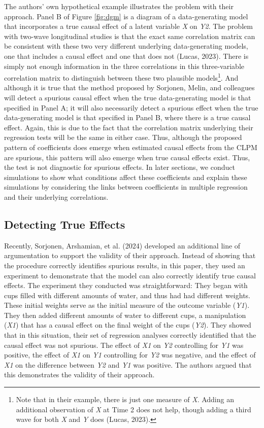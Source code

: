 \documentclass[
  man,floatsintext]{apa6}
\begin{document}
The authors' own hypothetical example illustrates the problem with their approach. Panel B of Figure \ref{fig:dgm} is a diagram of a data-generating model that incorporates a true causal effect of a latent variable \emph{X} on \emph{Y2}. The problem with two-wave longitudinal studies is that the exact same correlation matrix can be consistent with these two very different underlying data-generating models, one that includes a causal effect and one that does not (Lucas, 2023). There is simply not enough information in the three correlations in this three-variable correlation matrix to distinguish between these two plausible models\footnote{Note that in their example, there is just one measure of \emph{X}. Adding an additional observation of \emph{X} at Time 2 does not help, though adding a third wave for both \emph{X} and \emph{Y} does (Lucas, 2023).}. And although it is true that the method proposed by Sorjonen, Melin, and colleagues will detect a spurious causal effect when the true data-generating model is that specified in Panel A; it will also necessarily detect a spurious effect when the true data-generating model is that specified in Panel B, where there is a true causal effect. Again, this is due to the fact that the correlation matrix underlying their regression tests will be the same in either case. Thus, although the proposed pattern of coefficients does emerge when estimated causal effects from the CLPM are spurious, this pattern will also emerge when true causal effects exist. Thus, the test is not diagnostic for spurious effects. In later sections, we conduct simulations to show what conditions affect these coefficients and explain these simulations by considering the links between coefficients in multiple regression and their underlying correlations.

\subsection{Detecting True Effects}\label{detecting-true-effects}

Recently, Sorjonen, Arshamian, et al. (2024) developed an additional line of argumentation to support the validity of their approach. Instead of showing that the procedure correctly identifies spurious results, in this paper, they used an experiment to demonstrate that the model can also correctly identify true causal effects. The experiment they conducted was straightforward: They began with cups filled with different amounts of water, and thus had had different weights. These initial weights serve as the initial measure of the outcome variable (\emph{Y1}). They then added different amounts of water to different cups, a manipulation (\emph{X1}) that has a causal effect on the final weight of the cups (\emph{Y2}). They showed that in this situation, their set of regression analyses correctly identified that the causal effect was not spurious. The effect of \emph{X1} on \emph{Y2} controlling for \emph{Y1} was positive, the effect of \emph{X1} on \emph{Y1} controlling for \emph{Y2} was negative, and the effect of \emph{X1} on the difference between \emph{Y2} and \emph{Y1} was positive. The authors argued that this demonstrates the validity of their approach.
\end{document}
